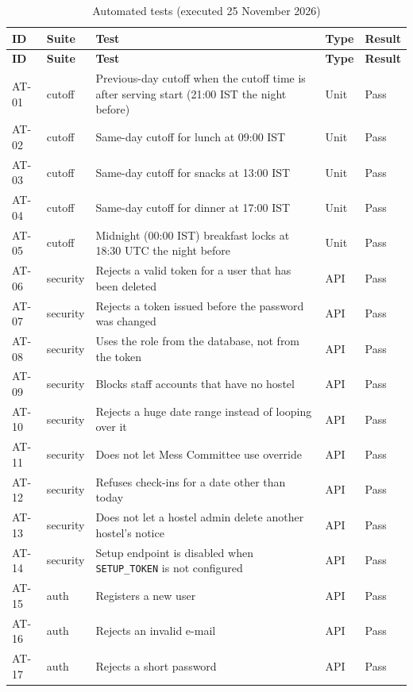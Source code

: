 \documentclass[11pt,a4paper]{article}
\begin{document}
\begin{longtable}{@{}L{1.0cm}L{2.9cm}L{8.2cm}L{1.0cm}L{1.0cm}@{}}
\caption{Automated tests (executed 25 November 2026)}\label{tab:autotests}\\
\toprule
\textbf{ID} & \textbf{Suite} & \textbf{Test} & \textbf{Type} & \textbf{Result}\\
\midrule
\endfirsthead
\toprule
\textbf{ID} & \textbf{Suite} & \textbf{Test} & \textbf{Type} & \textbf{Result}\\
\midrule
\endhead
\bottomrule
\endfoot
AT-01 & cutoff & Previous-day cutoff when the cutoff time is after serving start (21:00 IST the night before) & Unit & Pass\\
AT-02 & cutoff & Same-day cutoff for lunch at 09:00 IST & Unit & Pass\\
AT-03 & cutoff & Same-day cutoff for snacks at 13:00 IST & Unit & Pass\\
AT-04 & cutoff & Same-day cutoff for dinner at 17:00 IST & Unit & Pass\\
AT-05 & cutoff & Midnight (00:00 IST) breakfast locks at 18:30 UTC the night before & Unit & Pass\\
AT-06 & security & Rejects a valid token for a user that has been deleted & API & Pass\\
AT-07 & security & Rejects a token issued before the password was changed & API & Pass\\
AT-08 & security & Uses the role from the database, not from the token & API & Pass\\
AT-09 & security & Blocks staff accounts that have no hostel & API & Pass\\
AT-10 & security & Rejects a huge date range instead of looping over it & API & Pass\\
AT-11 & security & Does not let Mess Committee use override & API & Pass\\
AT-12 & security & Refuses check-ins for a date other than today & API & Pass\\
AT-13 & security & Does not let a hostel admin delete another hostel's notice & API & Pass\\
AT-14 & security & Setup endpoint is disabled when \texttt{SETUP\_TOKEN} is not configured & API & Pass\\
AT-15 & auth & Registers a new user & API & Pass\\
AT-16 & auth & Rejects an invalid e-mail & API & Pass\\
AT-17 & auth & Rejects a short password & API & Pass\\

\end{longtable}
\end{document}
